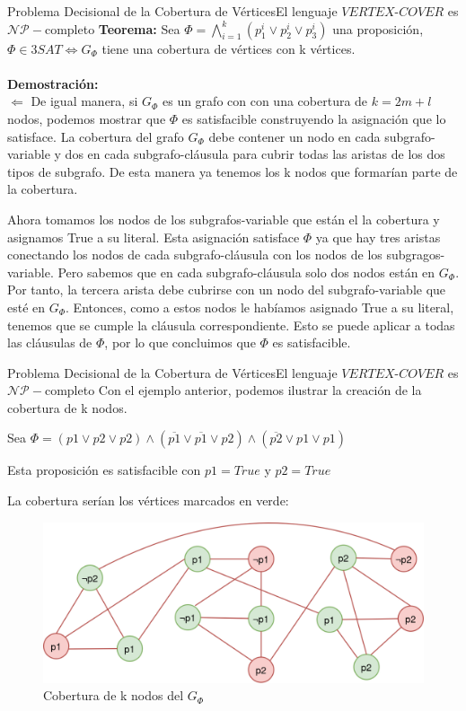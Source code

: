 \documentclass[10pt, envcountsect, presentation, aspectratio=169]{beamer}
\begin{document}
\begin{frame}{Problema Decisional de la Cobertura de Vértices}{El lenguaje $VERTEX\text{-}COVER$ es $\mathcal{NP}-$completo}
    \textbf{Teorema:} Sea $\Phi=\bigwedge_{i=1}^k(p_1^i \vee p_2^i \vee p_3^i)$ una proposición, $\Phi \in 3SAT \Leftrightarrow G_\Phi$  tiene una cobertura de vértices con k vértices. \\~\\

    \textbf{Demostración:} \\
    $\boxed{\Leftarrow}$ De igual manera, si $G_\Phi$ es un grafo con con una cobertura de $k=2m+l$ nodos, podemos mostrar que $\Phi$ es satisfacible construyendo la asignación que lo satisface.
    La cobertura del grafo $G_\Phi$ debe contener un nodo en cada subgrafo-variable y dos en cada subgrafo-cláusula para cubrir todas las aristas de los dos tipos de subgrafo. De esta manera ya tenemos los k nodos que formarían parte de la cobertura. 

    Ahora tomamos los nodos de los subgrafos-variable que están el la cobertura y asignamos True a su literal. Esta asignación satisface $\Phi$ ya que hay tres aristas conectando los nodos de cada subgrafo-cláusula con los nodos de los subgragos-variable. Pero sabemos que en cada subgrafo-cláusula solo dos nodos están en $G_ \Phi$. Por tanto, la tercera arista debe cubrirse con un nodo del subgrafo-variable que esté en $G_\Phi$. Entonces, como a estos nodos le habíamos asignado True a su literal, tenemos que se cumple la cláusula correspondiente. Esto se puede aplicar a todas las cláusulas de $\Phi$, por lo que concluimos que $\Phi$ es satisfacible.
\end{frame}

\begin{frame}{Problema Decisional de la Cobertura de Vértices}{El lenguaje $VERTEX\text{-}COVER$ es $\mathcal{NP}-$completo}
    \centering
    Con el ejemplo anterior, podemos ilustrar la creación de la cobertura de k nodos.

    Sea $\Phi = (p1 \vee p2 \vee p2) \wedge  (\overline{p1} \vee \overline{p1} \vee p2)\wedge  (\overline{p2} \vee p1 \vee p1)$
    
    Esta proposición es satisfacible con $p1 = True$ y $p2 = True$
    
    La cobertura serían los vértices marcados en verde:
    \begin{figure}
        \centering
        \includegraphics[width=0.55\linewidth]{images/T2_3_cobertura.png}
        \caption{Cobertura de k nodos del $G_\Phi$}
        \label{fig:enter-label}
    \end{figure}
\end{frame}
\end{document}
